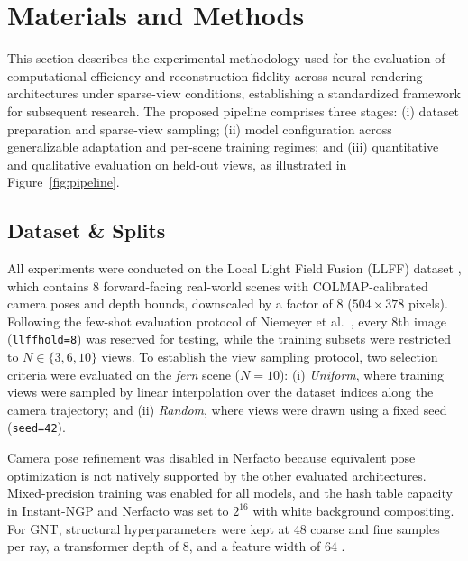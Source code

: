 \section{Materials and Methods}
\label{sec:methods}

This section describes the experimental methodology used for the evaluation of computational efficiency and reconstruction fidelity across neural rendering architectures under sparse-view conditions, establishing a standardized framework for subsequent research. The proposed pipeline comprises three stages: (i) dataset preparation and sparse-view sampling; (ii) model configuration across generalizable adaptation and per-scene training regimes; and (iii) quantitative and qualitative evaluation on held-out views, as illustrated in Figure~\ref{fig:pipeline}.



\subsection{Dataset \& Splits}
\label{sec:data}
All experiments were conducted on the Local Light Field Fusion (LLFF) dataset \cite{mildenhall2019locallightfieldfusion}, which contains 8 forward-facing real-world scenes with COLMAP-calibrated camera poses and depth bounds, downscaled by a factor of 8 ($504 \times 378$ pixels). Following the few-shot evaluation protocol of Niemeyer et al.\ \cite{niemeyer2022regnerf}, every 8th image (\texttt{llffhold=8}) was reserved for testing, while the training subsets were restricted to $N \in \{3, 6, 10\}$ views. To establish the view sampling protocol, two selection criteria were evaluated on the \textit{fern} scene ($N=10$): (i) \textit{Uniform}, where training views were sampled by linear interpolation over the dataset indices along the camera trajectory; and (ii) \textit{Random}, where views were drawn using a fixed seed (\texttt{seed=42}).

Camera pose refinement was disabled in Nerfacto because equivalent pose optimization is not natively supported by the other evaluated architectures. Mixed-precision training was enabled for all models, and the hash table capacity in Instant-NGP and Nerfacto was set to $2^{16}$ with white background compositing. For GNT, structural hyperparameters were kept at 48 coarse and fine samples per ray, a transformer depth of 8, and a feature width of 64 \cite{t2023attentionnerfneeds}.

